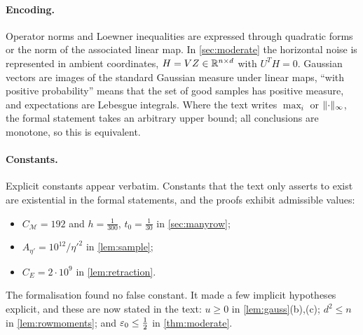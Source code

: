 \paragraph{Encoding.} Operator norms and Loewner inequalities are expressed
through quadratic forms or the norm of the associated linear map. In
\cref{sec:moderate} the horizontal noise is represented in ambient coordinates,
$H=VZ\in\mathbb R^{n\times d}$ with $U^TH=0$. Gaussian vectors are images of the
standard Gaussian measure under linear maps, ``with positive probability'' means
that the set of good samples has positive measure, and expectations are
Lebesgue integrals. Where the text writes $\max_i$ or $\lVert \cdot\rVert_\infty$, the
formal statement takes an arbitrary upper bound; all conclusions are monotone,
so this is equivalent.

\paragraph{Constants.} Explicit constants appear verbatim. Constants that the
text only asserts to exist are existential in the formal statements, and the
proofs exhibit admissible values:
\begin{itemize}
\item $C_{\mathcal M}=192$ and $h=\frac1{300}$, $t_0=\frac1{30}$ in \cref{sec:manyrow};
\item $A_{\eta'}=10^{12}/\eta'^2$ in \cref{lem:sample};
\item $C_E=2\cdot10^9$ in \cref{lem:retraction}.
\end{itemize}
The formalisation found no false constant. It made a few implicit hypotheses
explicit, and these are now stated in the text: $u\ge0$ in
\cref{lem:gauss}(b),(c); $d^2\le n$ in \cref{lem:rowmoments}; and
$\varepsilon_0\le\frac12$ in \cref{thm:moderate}.

